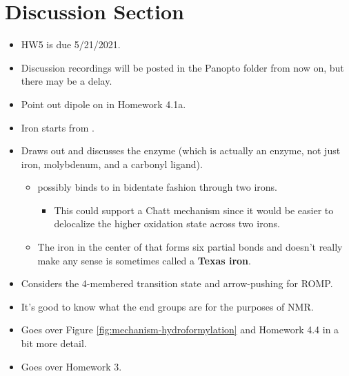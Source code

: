 \documentclass[../notes.tex]{subfiles}
\begin{document}
\section{Discussion Section}
\begin{itemize}
    \item {}HW5 is due 5/21/2021.
    \item Discussion recordings will be posted in the Panopto folder from now on, but there may be a delay.
    \item Point out dipole on  in Homework 4.1a.
    \item Iron starts from .
    \item Draws out and discusses the  enzyme (which is actually an enzyme, not just iron, molybdenum, and a carbonyl ligand).
    \begin{itemize}
        \item {} possibly binds to  in bidentate fashion through two irons.
        \begin{itemize}
            \item This could support a Chatt mechanism since it would be easier to delocalize the higher oxidation state across two irons.
        \end{itemize}
        \item The iron in the center of  that forms six partial bonds and doesn't really make any sense is sometimes called a \textbf{Texas iron}.
    \end{itemize}
    \item Considers the 4-membered transition state and arrow-pushing for ROMP.
    \item It's good to know what the end groups are for the purposes of NMR.
    \item Goes over Figure \ref{fig:mechanism-hydroformylation} and Homework 4.4 in a bit more detail.
    \item Goes over Homework 3.
\end{itemize}
\end{document}
